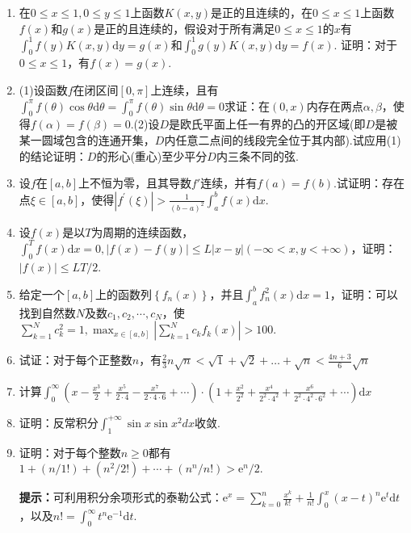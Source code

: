 \begin{enumerate}
	\item 在$0 \leqslant x \leqslant 1,0 \leqslant y \leqslant 1$上函数$K(x,y)$是正的且连续的，在$0 \leqslant x \leqslant 1$上函数$f(x)$和$g(x)$是正的且连续的，假设对于所有满足$0 \leqslant x \leqslant 1$的$x$有$\int_{0}^{1} f(y) K(x, y) \mathrm{d} y=g(x)$和$\int_{0}^{1} g(y) K(x, y) \mathrm{d} y=f(x)$.
	证明：对于$0 \leqslant x \leqslant 1$，有$f(x)=g(x)$.
	
	\item (1)设函数$f$在闭区间$[0,\pi ]$上连续，且有$\int_{0}^{\pi} f(\theta) \cos \theta \mathrm{d} \theta=\int_{0}^{\pi} f(\theta) \sin \theta \mathrm{d} \theta=0$求证：在$(0,x)$内存在两点$\alpha,\beta$，使得$f(\alpha)=f(\beta)=0$.(2)设$D$是欧氏平面上任一有界的凸的开区域(即$D$是被某一圆域包含的连通开集，$D$内任意二点间的线段完全位于其内部).试应用(1)的结论证明：$D$的形心(重心)至少平分$D$内三条不同的弦.
	
	\item 设$f$在$[a,b]$上不恒为零，且其导数$f'$连续，并有$f(a)=f(b)$.试证明：存在点$\xi \in[a,b]$，使得$\left|f^{\prime}(\xi)\right|>\frac{1}{(b-a)^{2}} \int_{a}^{b} f(x) \mathrm{d} x$.
	
	\item 设$f(x)$是以$T$为周期的连续函数，$\int_{0}^{T} f(x) \mathrm{d} x=0,|f(x)-f(y)| \leqslant L|x-y|(-\infty<x, y<+\infty)$，证明：$|f(x)| \leqslant L T / 2$.
	
	\item 给定一个$[a,b]$上的函数列$\left\{f_{n}(x)\right\}$，并且$\int_{a}^{b} f_{n}^{2}(x) \mathrm{d} x=1$，证明：可以找到自然数$N$及数$c_{1}, c_{2}, \cdots, c_{N}$，使$\sum_{k=1}^{N} c_{k}^{2}=1, \max _{x \in[a, b]}\left|\sum_{k=1}^{N} c_{k} f_{k}(x)\right|>100$.
	\item 试证：对于每个正整数$n$，有$\frac{2}{3} n \sqrt{n}<\sqrt{1}+\sqrt{2}+\dots+\sqrt{n}<\frac{4 n+3}{6} \sqrt{n}$
	\item 计算$\int_{0}^{\infty}\left(x-\frac{x^{3}}{2}+\frac{x^{5}}{2 \cdot 4}-\frac{x^{7}}{2 \cdot 4 \cdot 6}+\cdots\right) \cdot\left(1+\frac{x^{2}}{2^{2}}+\frac{x^{4}}{2^{2} \cdot 4^{2}}+\frac{x^{6}}{2^{2} \cdot 4^{2} \cdot 6^{2}}+\cdots\right) \mathrm{d}x$
	\item 证明：反常积分$\int_{1}^{+\infty} \sin x \sin x^{2} d x$收敛.
	
	
	\item 证明：对于每个整数$n\geq 0$都有$1+(n / 1 !)+\left(n^{2} / 2 !\right)+\cdots+\left(n^{n} / n !\right)>\mathrm{e}^{n} / 2$.
	
	\textbf{提示：}可利用积分余项形式的泰勒公式：$\mathrm{e}^{x}=\sum_{k=0}^{n} \frac{x^{k}}{k !}+\frac{1}{n !} \int_{0}^{x}(x-t)^{n} \mathrm{e}^{t} \mathrm{d} t$，以及$n !=\int_{0}^{\infty} t^{n} \mathrm{e}^{-1} \mathrm{d} t$.
	

\end{enumerate}
